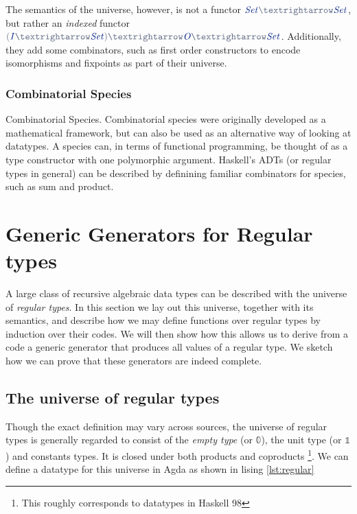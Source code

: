 \documentclass[a4paper,msc,twosized=semi]{uustthesis}
\newcommand*{\mathcolor}{}
\def\mathcolor#1#{\mathcoloraux{#1}}
\newcommand*{\mathcoloraux}[3]{%
  \protect\leavevmode
  \begingroup
    \color#1{#2}#3%
  \endgroup
}
\newcommand{\HSSpecial}[1]{\mathcolor{hsblue4}{#1}}
\newcommand{\HSSym}[1]{\mathcolor{hsblue4}{#1}}
\newcommand{\HSCon}[1]{\mathcolor{hsblue3}{\mathit{#1}}}
\begin{document}
  The semantics of the universe, however, is not a functor \ensuremath{\HSCon{Set}\HSSym{→}\HSCon{Set}}, but rather an 
  \emph{indexed} functor \ensuremath{\HSSpecial{(}\HSCon{I}\HSSym{→}\HSCon{Set}\HSSpecial{)}\HSSym{→}\HSCon{O}\HSSym{→}\HSCon{Set}}. Additionally, they add some 
  combinators, such as first order constructors to encode isomorphisms and fixpoints 
  as part of their universe. 

\subsection{Combinatorial Species}

  Combinatorial Species. Combinatorial species \cite{yorgey2010species} were 
  originally developed as a mathematical framework, but can also be used as an 
  alternative way of looking at datatypes. A species can, in terms of functional 
  programming, be thought of as a type constructor with one polymorphic argument. 
  Haskell’s ADTs (or regular types in general) can be described by definining familiar 
  combinators for species, such as sum and product.

\chapter{Generic Generators for Regular types}

  A large class of recursive algebraic data types can be described with the universe 
  of \emph{regular types}. In this section we lay out this universe, together with its 
  semantics, and describe how we may define functions over regular types by induction 
  over their codes. We will then show how this allows us to derive from a code a 
  generic generator that produces all values of a regular type. We sketch how we can 
  prove that these generators are indeed complete. 

\section{The universe of regular types}

  Though the exact definition may vary across sources, the universe of regular types 
  is generally regarded to consist of the \emph{empty type} (or $\mathbb{0}$), the 
  unit type (or $\mathbb{1}$) and constants types. It is closed under both products 
  and coproducts \footnote{This roughly corresponds to datatypes in Haskell 98}. We 
  can define a datatype for this universe in Agda as shown in lising \ref{lst:regular}
\end{document}
